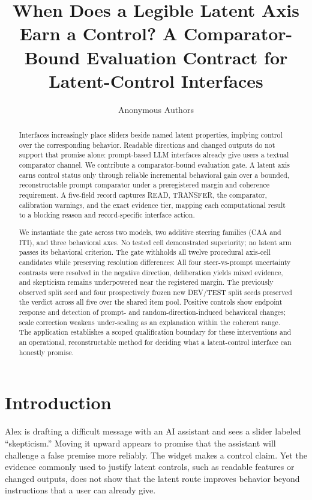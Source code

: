 \documentclass[sigconf]{acmart}
\title{When Does a Legible Latent Axis Earn a Control? A Comparator-Bound Evaluation Contract for Latent-Control Interfaces}
\author{Anonymous Authors}
\affiliation{%
  \institution{Anonymous Institution}
  \city{Anonymous City}
  \country{}}
\begin{document}
\begin{abstract}
Interfaces increasingly place sliders beside named latent properties, implying control over the corresponding behavior. Readable directions and changed outputs do not support that promise alone: prompt-based LLM interfaces already give users a textual comparator channel. We contribute a comparator-bound evaluation gate. A latent axis earns control status only through reliable incremental behavioral gain over a bounded, reconstructable prompt comparator under a preregistered margin and coherence requirement. A five-field record captures READ, TRANSFER, the comparator, calibration warnings, and the exact evidence tier, mapping each computational result to a blocking reason and record-specific interface action.

We instantiate the gate across two models, two additive steering families (CAA and ITI), and three behavioral axes. No tested cell demonstrated superiority; no latent arm passes its behavioral criterion. The gate withholds all twelve procedural axis-cell candidates while preserving resolution differences: All four steer-vs-prompt uncertainty contrasts were resolved in the negative direction, deliberation yields mixed evidence, and skepticism remains underpowered near the registered margin. The previously observed split seed and four prospectively frozen new DEV/TEST split seeds preserved the verdict across all five over the shared item pool. Positive controls show endpoint response and detection of prompt- and random-direction-induced behavioral changes; scale correction weakens under-scaling as an explanation within the coherent range. The application establishes a scoped qualification boundary for these interventions and an operational, reconstructable method for deciding what a latent-control interface can honestly promise.
\end{abstract}

\maketitle

\section{Introduction}
\label{sec:introduction}

Alex is drafting a difficult message with an AI assistant and sees a slider labeled ``skepticism.'' Moving it upward appears to promise that the assistant will challenge a false premise more reliably. The widget makes a control claim. Yet the evidence commonly used to justify latent controls, such as readable features or changed outputs, does not show that the latent route improves behavior beyond instructions that a user can already give.
\end{document}
